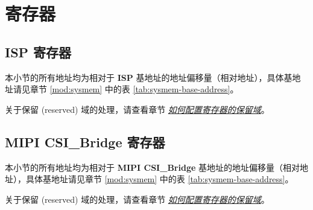 \documentclass[main\_\_CN.tex]{subfiles}
\begin{document}





\newpage
\section{寄存器}

\subsection{ISP 寄存器}

本小节的所有地址均为相对于 \textbf{ISP} 基地址的地址偏移量（相对地址），具体基地址请见章节 \ref{mod:sysmem} \textit{} 中的表 \ref{tab:sysmem-base-address}。

关于保留 (reserved) 域的处理，请查看章节 \hyperref[programming-reserved-field]{\textit{如何配置寄存器的保留域}}。





\subsection{MIPI CSI\_Bridge 寄存器}

本小节的所有地址均为相对于 \textbf{MIPI CSI\_Bridge} 基地址的地址偏移量（相对地址），具体基地址请见章节 \ref{mod:sysmem} \textit{} 中的表 \ref{tab:sysmem-base-address}。

关于保留 (reserved) 域的处理，请查看章节 \hyperref[programming-reserved-field]{\textit{如何配置寄存器的保留域}}。


\end{document}
